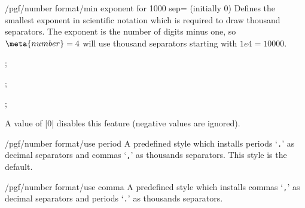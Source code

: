 \documentclass[a4paper]{ltxdoc}
\begin{document}
\begin{key}{/pgf/number format/min exponent for 1000 sep= (initially 0)}
    Defines the smallest exponent in scientific notation which is required to
    draw thousand separators. The exponent is the number of digits minus one,
    so $\meta{number}=4$ will use thousand separators starting with $1e4 =
    10000$.
\begin{codeexample}[]
; 
\end{codeexample}

\begin{codeexample}[]
; 
\end{codeexample}

\begin{codeexample}[]
; 
\end{codeexample}
    \noindent A value of |0| disables this feature (negative values are
    ignored).
\end{key}


\begin{key}{/pgf/number format/use period}
    A predefined style which installs periods `\texttt{.}' as decimal
    separators and commas `\texttt{,}' as thousands separators. This style is
    the default.
\begin{codeexample}[]
\end{codeexample}

\begin{codeexample}[]
\end{codeexample}
\end{key}

\begin{key}{/pgf/number format/use comma}
    A predefined style which installs commas `\texttt{,}' as decimal separators
    and periods `\texttt{.}' as thousands separators.
\begin{codeexample}[]
\end{codeexample}

\begin{codeexample}[]
\end{codeexample}
\end{key}
\end{document}
